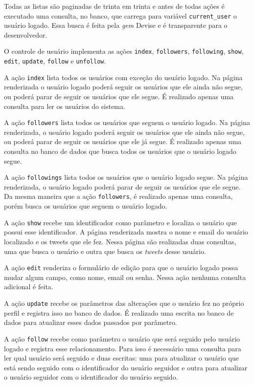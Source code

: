 Todas as listas são paginadas de trinta em trinta e antes de todas ações é executado uma consulta, no banco, que carrega para variável \verb|current_user| o usuário logado. Essa busca é feita pela \textit{gem} Devise e é transparente para o desenvolvedor.

O controle de usuário implementa as ações \verb|index|, \verb|followers|, \verb|following|, \verb|show|, \verb|edit|, \verb|update|, \verb|follow| e \verb|unfollow|.

A ação \verb|index| lista todos os usuários com exceção do usuário logado. Na página renderizada o usuário logado poderá seguir os usuários que ele ainda não segue, ou poderá parar de seguir os usuários que ele segue. É realizado apenas uma consulta para ler os usuários do sistema.

A ação \verb|followers| lista todos os usuários que seguem o usuário logado. Na página renderizada, o usuário logado poderá seguir os usuários que ele ainda não segue, ou poderá parar de seguir os usuários que ele já segue. É realizado apenas uma consulta no banco de dados que busca todos os usuários que o usuário logado segue.

A ação \verb|followings| lista todos os usuários que o usuário logado segue. Na página renderizada, o usuário logado poderá parar de seguir os usuários que ele segue. Da mesma maneira que a ação \verb|followers|, é realizado apenas uma consulta, porém busca os usuários que seguem o usuário logado.

A ação \verb|show| recebe um identificador como parâmetro e localiza o usuário que possui esse identificador. A página renderizada mostra o nome e email do usuário localizado e os tweets que ele fez. Nessa página são realizadas duas consultas, uma que busca o usuário e outra que busca os \textit{tweets} desse usuário.

A ação \verb|edit| renderiza o formulário de edição para que o usuário logado possa mudar algum campo, como nome, email ou senha. Nessa ação nenhuma consulta adicional é feita.

A ação \verb|update| recebe os parâmetros das alterações que o usuário fez no próprio perfil e registra isso no banco de dados. É realizado uma escrita no banco de dados para atualizar esses dados passados por parâmetro.

A ação \verb|follow| recebe como parâmetro o usuário que será seguido pelo usuário logado e registra esse relacionamento. Para isso é necessário uma consulta para ler qual usuário será seguido e duas escritas: uma para atualizar o usuário que está sendo seguido com o identificador do usuário seguidor e outra para atualizar o usuário seguidor com o identificador do usuário seguido.

